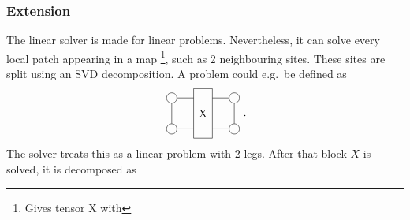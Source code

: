 \subsubsection{Extension}
The linear solver is made for linear problems. Nevertheless, it can solve every local patch appearing in a map \footnote{Gives tensor X with   }, such as 2 neighbouring sites. These sites are split using an \Gls{SVD} decomposition.  A problem could e.g.\ be defined as
\begin{equation}
    \vcenter{\hbox{  \begin{tikzpicture}[baseline=0.5]

                \def \legLength { 0.8}
                \def \radius {0.1}

                \pgfmathsetmacro{\step}{2*\radius+ \legLength} %
                \pgfmathsetmacro{\legpos}{\radius+\legLength} %

                \node[draw, circle,radius=\radius] (L0) at (-1,0) {};
                \node[draw, circle,radius=\radius] (L1) at (-1,1) {};

                \draw (-0.3,1.3) -- (0.3,1.3) -- (0.3,-0.3) -- (-0.3,-0.3) -- cycle;

                \node[draw, circle,radius=\radius] (R0) at (1,0) {};
                \node[draw, circle,radius=\radius] (R1) at (1,1) {};

                \draw (L0) --   (L1);
                \draw (R0) --   (R1);

                \draw (L0) --   (-0.3,0);
                \draw (L1) --   (-0.3,1);

                \draw (R0) --   (0.3,0);
                \draw (R1) --   (0.3,1);

                \node[draw=none] (C0) at (0,0.5) {X};
            \end{tikzpicture} }} .
\end{equation}
The solver treats this as a linear problem with 2 legs. After that block $X$ is solved, it is decomposed as
